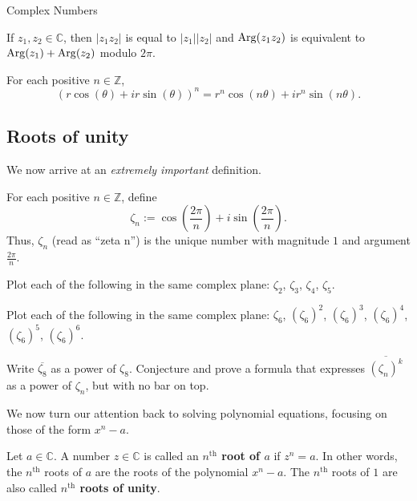 \begin{section}{Complex Numbers}
\begin{corollary}
If $z_1,z_2\in \mathbb{C}$, then $|z_1z_2|$ is equal to $|z_1||z_2|$ and $\operatorname{Arg}(z_1z_2)$ is equivalent to $\operatorname{Arg}(z_1)+\operatorname{Arg}(z_2)$ modulo $2\pi$.
\end{corollary}

\begin{corollary}\label{cor.DeMoivre}
For each positive $n\in \mathbb{Z}$, \[\left(r\cos(\theta) + ir\sin(\theta)\right)^n = r^n\cos(n\theta) + ir^n\sin(n\theta).\]
\end{corollary}

\subsection{Roots of unity}
We now arrive at an \emph{extremely important} definition.

\begin{definition}
For each positive $n\in \mathbb{Z}$, define \[\zeta_n := \cos\left(\frac{2\pi}{n}\right) + i\sin\left(\frac{2\pi}{n}\right).\]
Thus, $\zeta_n$ (read as ``zeta n'') is the unique  number with magnitude $1$ and argument $\frac{2\pi}{n}$.
\end{definition}

\begin{problem}
Plot each of the following in the same complex plane: $\zeta_2$, $\zeta_3$, $\zeta_4$, $\zeta_5$.
\end{problem}

\begin{problem}
Plot each of the following in the same complex plane: $\zeta_6$, $(\zeta_6)^2$, $(\zeta_6)^3$, $(\zeta_6)^4$, $(\zeta_6)^5$, $(\zeta_6)^6$.
\end{problem}

\begin{problem}
Write $\overline{\zeta_8}$ as a power of $\zeta_8$. Conjecture and prove a formula that expresses $\overline{(\zeta_n)^k}$ as a power of $\zeta_n$, but with no bar on top.
\end{problem}

We now turn our attention back to solving polynomial equations, focusing on those of the form $x^n - a$.

\begin{definition}
Let $a\in \mathbb{C}$. A number $z\in \mathbb{C}$ is called an \textbf{$n^\text{th}$ root of $a$} if $z^n = a$. In other words, the  $n^\text{th}$ roots of $a$ are the roots of the polynomial $x^n-a$. The  $n^\text{th}$ roots of $1$ are also called \textbf{$n^\text{th}$ roots of unity}.
\end{definition}


\end{section}
